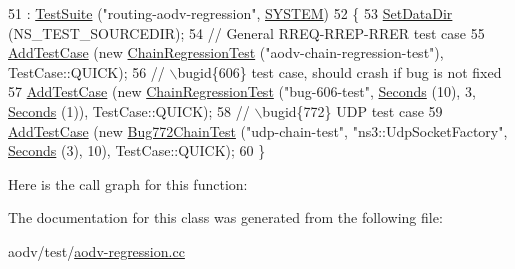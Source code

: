 \begin{DoxyCode}
51                              : \hyperlink{classns3_1_1TestSuite_a904b0c40583b744d30908aeb94636d1a}{TestSuite} (\textcolor{stringliteral}{"routing-aodv-regression"}, 
      \hyperlink{classns3_1_1TestSuite_a1ebfcab34ec8161e085e8e3a1855eae0a90c5529a26ab3a5ffcc6e57040dbd82e}{SYSTEM}) 
52   \{
53     \hyperlink{classns3_1_1TestCase_ab002fb0e5071fcde71a92ca9e8224b23}{SetDataDir} (NS\_TEST\_SOURCEDIR);
54     \textcolor{comment}{// General RREQ-RREP-RRER test case}
55     \hyperlink{classns3_1_1TestCase_a3718088e3eefd5d6454569d2e0ddd835}{AddTestCase} (\textcolor{keyword}{new} \hyperlink{classChainRegressionTest}{ChainRegressionTest} (\textcolor{stringliteral}{"aodv-chain-regression-test"}), 
      TestCase::QUICK);
56     \textcolor{comment}{// \(\backslash\)bugid\{606\} test case, should crash if bug is not fixed}
57     \hyperlink{classns3_1_1TestCase_a3718088e3eefd5d6454569d2e0ddd835}{AddTestCase} (\textcolor{keyword}{new} \hyperlink{classChainRegressionTest}{ChainRegressionTest} (\textcolor{stringliteral}{"bug-606-test"}, 
      \hyperlink{group__timecivil_ga33c34b816f8ff6628e33d5c8e9713b9e}{Seconds} (10), 3, \hyperlink{group__timecivil_ga33c34b816f8ff6628e33d5c8e9713b9e}{Seconds} (1)), TestCase::QUICK);
58     \textcolor{comment}{// \(\backslash\)bugid\{772\} UDP test case}
59     \hyperlink{classns3_1_1TestCase_a3718088e3eefd5d6454569d2e0ddd835}{AddTestCase} (\textcolor{keyword}{new} \hyperlink{classBug772ChainTest}{Bug772ChainTest} (\textcolor{stringliteral}{"udp-chain-test"}, \textcolor{stringliteral}{"ns3::UdpSocketFactory"}, 
      \hyperlink{group__timecivil_ga33c34b816f8ff6628e33d5c8e9713b9e}{Seconds} (3), 10), TestCase::QUICK);
60   \}
\end{DoxyCode}


Here is the call graph for this function\+:




The documentation for this class was generated from the following file\+:\begin{DoxyCompactItemize}
\item 
aodv/test/\hyperlink{aodv-regression_8cc}{aodv-\/regression.\+cc}\end{DoxyCompactItemize}
